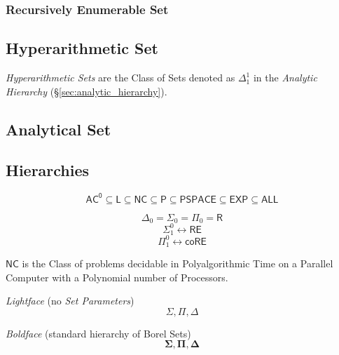 \subsubsection{Recursively Enumerable Set}\label{sec:recursively_enumerable}



\subsection{Hyperarithmetic Set}\label{sec:hyperarithmetic_set}

\emph{Hyperarithmetic Sets} are the Class of Sets denoted as
$\Delta^1_1$ in the \emph{Analytic Hierarchy}
(\S\ref{sec:analytic_hierarchy}).



\subsection{Analytical Set}\label{sec:analytical_set}

\subsection{Hierarchies}\label{sec:complexity_hierarchy}

\[
  \mathsf{AC^0} \subseteq \mathsf{L} \subseteq \mathsf{NC} \subseteq
  \mathsf{P} \subseteq \mathsf{PSPACE} \subseteq \mathsf{EXP}
  \subseteq \mathsf{ALL}
\]

\[
  \Delta_0 = \Sigma_0 = \Pi_0 = \mathsf{R}
\]\[
  \Sigma_1^0 \leftrightarrow \mathsf{RE}
\]\[
  \Pi_1^0 \leftrightarrow \mathsf{coRE}
\]

\emph{$\mathsf{NC}$} is the Class of problems decidable in
Polyalgorithmic Time on a Parallel Computer with a Polynomial number
of Processors.

\emph{Lightface} (no \emph{Set Parameters}) %
\[
  \Sigma, \Pi, \Delta
\]

\emph{Boldface} (standard hierarchy of Borel Sets)
\[
  \mathbf{\Sigma}, \mathbf{\Pi}, \mathbf{\Delta}
\]

